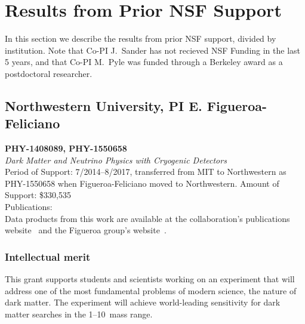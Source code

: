 
\section{Results from Prior NSF Support}
\label{sec:prev-res}

In this section we describe the results from prior NSF support, divided by institution. Note that Co-PI J.~Sander has not recieved NSF Funding in the last 5 years, and that Co-PI M.~Pyle was funded through a Berkeley award as a postdoctoral researcher.

\subsection{Northwestern University, PI E. Figueroa-Feliciano}

\vspace{3pt}
\noindent\textbf{PHY-1408089, PHY-1550658}\\ 
\emph{Dark Matter and Neutrino Physics with Cryogenic Detectors}\\
Period of Support: 7/2014--8/2017, transferred from MIT to Northwestern as PHY-1550658 when Figueroa-Feliciano moved to Northwestern. Amount of Support: \$330,535\\
Publications:~\cite{SuperCDMSSensitvitiy:2016arXiv,Agnese:2015nto,OHare2015Readout-strateg,Agnese:2015ywx,Schneck2015Dark-matter-eff,Pyle2015Optimized-Desig,Agnese:2014xye,Agnese:2014vxh,2015PhRvD..91i5023B,Ruppin:2014bra,Agnese:2014aze}\\
Data products from this work are available at the \SuperCDMS collaboration's publications website~\cite{CDMSpubs} and the Figueroa group's website~\cite{FigueroaWeb}.


\subsubsection{Intellectual merit} 
This grant supports students and scientists working on an experiment that will address one of the most fundamental problems of modern science, the nature of dark matter. The \scs experiment will achieve world-leading sensitivity for dark matter searches in the 1--10~\gev mass range.

